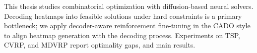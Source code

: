 \begin{abstractalt}
This thesis studies combinatorial optimization with diffusion-based neural solvers.
Decoding heatmaps into feasible solutions under hard constraints is a primary bottleneck;
we apply decoder-aware reinforcement fine-tuning in the CADO style to align heatmap generation with the decoding process.
Experiments on TSP, CVRP, and MDVRP report optimality gaps, and main results.
\end{abstractalt}
